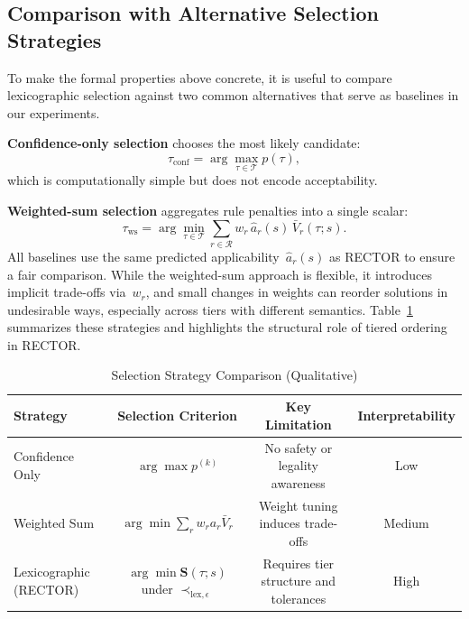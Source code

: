 \subsection{Comparison with Alternative Selection Strategies}
\label{subsec:strategy_comparison}

To make the formal properties above concrete, it is useful to compare lexicographic selection against two common alternatives that serve as baselines in our experiments.

\textbf{Confidence-only selection} chooses the most likely candidate:
\begin{equation}
\tau_{\text{conf}}=\arg\max_{\tau \in \mathcal{T}} p(\tau),
\end{equation}
which is computationally simple but does not encode acceptability.

\textbf{Weighted-sum selection} aggregates rule penalties into a single scalar:
\begin{equation}
\tau_{\text{ws}}=\arg\min_{\tau \in \mathcal{T}} \sum_{r \in \mathcal{R}} w_r\,\hat{a}_r(s)\,\bar{V}_r(\tau;s).
\end{equation}
All baselines use the same predicted applicability~$\hat{a}_r(s)$ as RECTOR to ensure a fair comparison.  While the weighted-sum approach is flexible, it introduces implicit trade-offs via~$w_r$, and small changes in weights can reorder solutions in undesirable ways, especially across tiers with different semantics.  Table~\ref{tab:selection_strategy_qualitative} summarizes these strategies and highlights the structural role of tiered ordering in RECTOR.

\begin{table}
\centering
\caption{Selection Strategy Comparison (Qualitative)}
\label{tab:selection_strategy_qualitative}
\begin{tabular}{lccc}
\toprule
\textbf{Strategy} & \textbf{Selection Criterion} & \textbf{Key Limitation} & \textbf{Interpretability} \\
\midrule
Confidence Only & $\arg\max p^{(k)}$ & No safety or legality awareness & Low \\
Weighted Sum & $\arg\min \sum_r w_r a_r \bar{V}_r$ & Weight tuning induces trade-offs & Medium \\
Lexicographic (RECTOR) & $\arg\min \mathbf{S}(\tau;s)$ under $\prec_{\text{lex},\epsilon}$ & Requires tier structure and tolerances & High \\
\bottomrule
\end{tabular}
\end{table}

